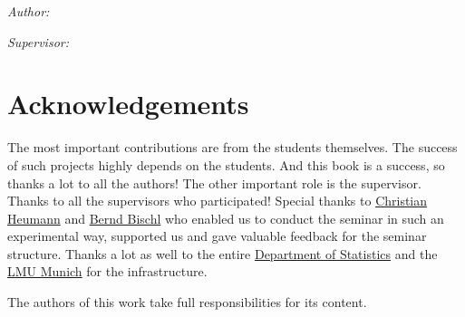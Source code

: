 \documentclass[
]{krantz}
\begin{document}
\emph{Author:}

\emph{Supervisor:}

\hypertarget{acknowledgements}{%
\chapter{Acknowledgements}\label{acknowledgements}}

The most important contributions are from the students themselves.
The success of such projects highly depends on the students.
And this book is a success, so thanks a lot to all the authors!
The other important role is the supervisor.
Thanks to all the supervisors who participated!
Special thanks to \href{https://www.misoda.statistik.uni-muenchen.de/personen/professoren/heumann/index.html}{Christian Heumann} and \href{https://www.statistik.uni-muenchen.de/personen/professoren/bischl/index.html}{Bernd Bischl} who enabled us to conduct the seminar in such an experimental way, supported us and gave valuable feedback for the seminar structure.
Thanks a lot as well to the entire \href{https://www.statistik.uni-muenchen.de/}{Department of Statistics} and the \href{http://www.en.uni-muenchen.de/index.html}{LMU Munich} for the infrastructure.

The authors of this work take full responsibilities for its content.

  

\backmatter
\printindex
\end{document}
